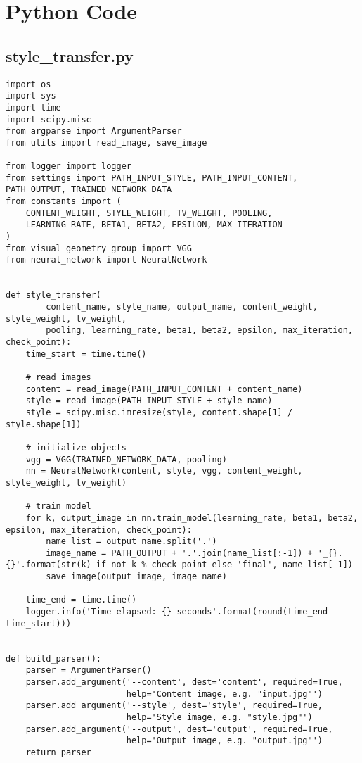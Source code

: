 \chapter{Python Code}
\label{app:code}


\begin{spacing}{1.2}
\section{style\_transfer.py}
\label{sec:code:st}
\begin{lstlisting}
import os
import sys
import time
import scipy.misc
from argparse import ArgumentParser
from utils import read_image, save_image

from logger import logger
from settings import PATH_INPUT_STYLE, PATH_INPUT_CONTENT, PATH_OUTPUT, TRAINED_NETWORK_DATA
from constants import (
    CONTENT_WEIGHT, STYLE_WEIGHT, TV_WEIGHT, POOLING,
    LEARNING_RATE, BETA1, BETA2, EPSILON, MAX_ITERATION
)
from visual_geometry_group import VGG
from neural_network import NeuralNetwork


def style_transfer(
        content_name, style_name, output_name, content_weight, style_weight, tv_weight,
        pooling, learning_rate, beta1, beta2, epsilon, max_iteration, check_point):
    time_start = time.time()

    # read images
    content = read_image(PATH_INPUT_CONTENT + content_name)
    style = read_image(PATH_INPUT_STYLE + style_name)
    style = scipy.misc.imresize(style, content.shape[1] / style.shape[1])

    # initialize objects
    vgg = VGG(TRAINED_NETWORK_DATA, pooling)
    nn = NeuralNetwork(content, style, vgg, content_weight, style_weight, tv_weight)

    # train model
    for k, output_image in nn.train_model(learning_rate, beta1, beta2, epsilon, max_iteration, check_point):
        name_list = output_name.split('.')
        image_name = PATH_OUTPUT + '.'.join(name_list[:-1]) + '_{}.{}'.format(str(k) if not k % check_point else 'final', name_list[-1])
        save_image(output_image, image_name)

    time_end = time.time()
    logger.info('Time elapsed: {} seconds'.format(round(time_end - time_start)))


def build_parser():
    parser = ArgumentParser()
    parser.add_argument('--content', dest='content', required=True,
                        help='Content image, e.g. "input.jpg"')
    parser.add_argument('--style', dest='style', required=True,
                        help='Style image, e.g. "style.jpg"')
    parser.add_argument('--output', dest='output', required=True,
                        help='Output image, e.g. "output.jpg"')
    return parser



\end{lstlisting}
\end{spacing}
